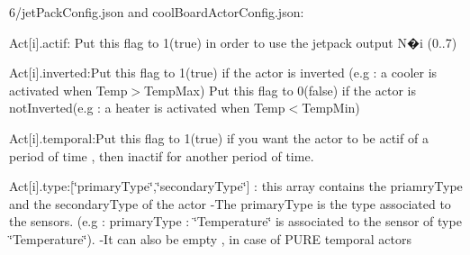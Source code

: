 6/jet\+Pack\+Config.\+json and cool\+Board\+Actor\+Config.\+json\+:

Act\mbox{[}i\mbox{]}.actif\+: Put this flag to 1(true) in order to use the jetpack output N�i (0..7)

Act\mbox{[}i\mbox{]}.inverted\+:Put this flag to 1(true) if the actor is inverted (e.\+g \+: a cooler is activated when Temp$>$Temp\+Max) Put this flag to 0(false) if the actor is not\+Inverted(e.\+g \+: a heater is activated when Temp$<$Temp\+Min)

Act\mbox{[}i\mbox{]}.temporal\+:Put this flag to 1(true) if you want the actor to be actif of a period of time , then inactif for another period of time.

Act\mbox{[}i\mbox{]}.type\+:\mbox{[}\char`\"{}primary\+Type\char`\"{},\char`\"{}secondary\+Type\char`\"{}\mbox{]} \+: this array contains the priamry\+Type and the secondary\+Type of the actor -\/\+The primary\+Type is the type associated to the sensors. (e.\+g \+: primary\+Type \+: \char`\"{}\+Temperature\char`\"{} is associated to the sensor of type \char`\"{}\+Temperature\char`\"{}). -\/\+It can also be empty , in case of P\+U\+RE temporal actors

